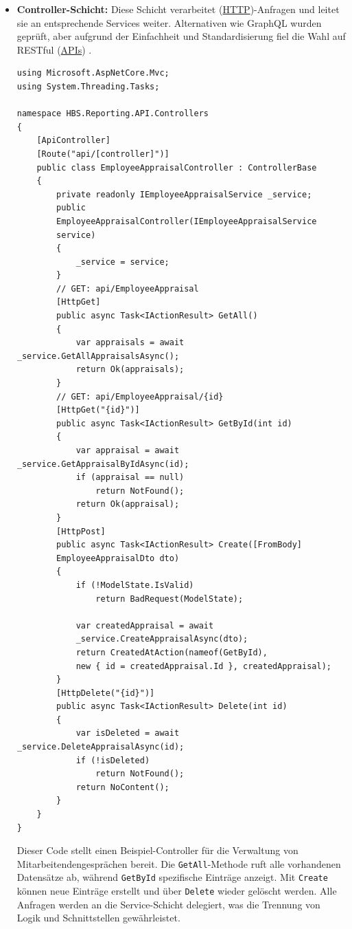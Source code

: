 \begin{itemize}
     \item \textbf{Controller-Schicht:} Diese Schicht verarbeitet (\hyperref[abkuerzungen]{HTTP})-Anfragen und leitet sie an entsprechende Services weiter. Alternativen wie GraphQL wurden geprüft, aber aufgrund der Einfachheit und Standardisierung fiel die Wahl auf RESTful (\hyperref[abkuerzungen]{APIs}) \cite{fielding2000rest}.
\newpage
\begin{verbatim}
using Microsoft.AspNetCore.Mvc;
using System.Threading.Tasks;

namespace HBS.Reporting.API.Controllers
{
    [ApiController]
    [Route("api/[controller]")]
    public class EmployeeAppraisalController : ControllerBase
    {
        private readonly IEmployeeAppraisalService _service;
        public 
        EmployeeAppraisalController(IEmployeeAppraisalService 
        service)
        {
            _service = service;
        }
        // GET: api/EmployeeAppraisal
        [HttpGet]
        public async Task<IActionResult> GetAll()
        {
            var appraisals = await _service.GetAllAppraisalsAsync();
            return Ok(appraisals);
        }
        // GET: api/EmployeeAppraisal/{id}
        [HttpGet("{id}")]
        public async Task<IActionResult> GetById(int id)
        {
            var appraisal = await _service.GetAppraisalByIdAsync(id);
            if (appraisal == null)
                return NotFound();
            return Ok(appraisal);
        }
        [HttpPost]
        public async Task<IActionResult> Create([FromBody] 
        EmployeeAppraisalDto dto)
        {
            if (!ModelState.IsValid)
                return BadRequest(ModelState);

            var createdAppraisal = await 
            _service.CreateAppraisalAsync(dto);
            return CreatedAtAction(nameof(GetById), 
            new { id = createdAppraisal.Id }, createdAppraisal);
        }
        [HttpDelete("{id}")]
        public async Task<IActionResult> Delete(int id)
        {
            var isDeleted = await _service.DeleteAppraisalAsync(id);
            if (!isDeleted)
                return NotFound();
            return NoContent();
        }
    }
}
\end{verbatim}

Dieser Code stellt einen Beispiel-Controller für die Verwaltung von Mitarbeitendengesprächen bereit. Die \texttt{GetAll}-Methode ruft alle vorhandenen Datensätze ab, während \texttt{GetById} spezifische Einträge anzeigt. Mit \texttt{Create} können neue Einträge erstellt und über \texttt{Delete} wieder gelöscht werden. Alle Anfragen werden an die Service-Schicht delegiert, was die Trennung von Logik und Schnittstellen gewährleistet.


\end{itemize}
